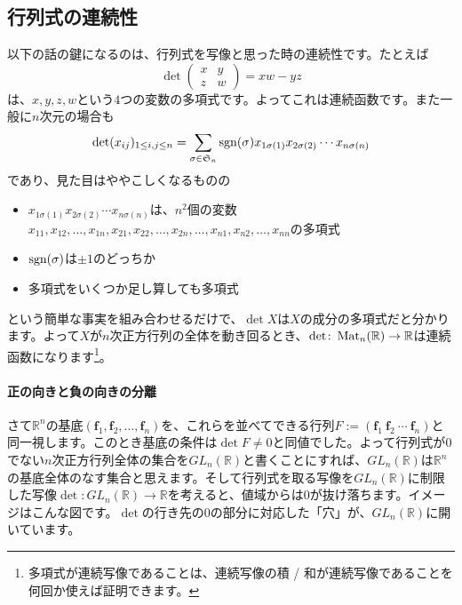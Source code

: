 
\subsection{行列式の連続性}

以下の話の鍵になるのは、行列式を写像と思った時の連続性です。たとえば
\[
\det
\begin{pmatrix}
x & y \\
z & w
\end{pmatrix}
= xw - yz
\]
は、$x, y, z, w$という$4$つの変数の多項式です。よってこれは連続函数です。また一般に$n$次元の場合も
\[
\det (x_{ij})_{1 \leq i, j \leq n} = \sum_{\sigma \in \mathfrak{S}_n} \operatorname{sgn}(\sigma) x_{1 \sigma(1)} x_{2 \sigma(2)} \cdots x_{n \sigma(n)}
\]
であり、見た目はややこしくなるものの
\begin{itemize}
\item $x_{1 \sigma(1)} x_{2 \sigma(2)} \cdots x_{n \sigma(n)}$は、$n^2$個の変数$x_{11}, x_{12}, \ldots, x_{1n}, x_{21}, x_{22}, \ldots, x_{2n}, \ldots, x_{n1}, x_{n2}, \ldots, x_{nn}$の多項式
\item $\operatorname{sgn}(\sigma)$は$\pm1$のどっちか
\item 多項式をいくつか足し算しても多項式
\end{itemize}
という簡単な事実を組み合わせるだけで、$\det X$は$X$の成分の多項式だと分かります。よって$X$が$n$次正方行列の全体を動き回るとき、$\det\colon \operatorname{Mat}_n(\mathbb{R}) \rightarrow \mathbb{R}$は連続函数になります\footnote{多項式が連続写像であることは、連続写像の積 / 和が連続写像であることを何回か使えば証明できます。}。

\paragraph{正の向きと負の向きの分離}
さて$\mathbb{R}^n$の基底$(\bm{f}_1, \bm{f}_2, \ldots, \bm{f}_n)$を、これらを並べてできる行列$F := (\bm{f}_1 \  \bm{f}_2 \  \cdots \  \bm{f}_n)$と同一視します。このとき基底の条件は$\det F \neq 0$と同値でした。よって行列式が$0$でない$n$次正方行列全体の集合を$GL_n(\mathbb{R})$と書くことにすれば、$GL_n(\mathbb{R})$は$\mathbb{R}^n$の基底全体のなす集合と思えます。そして行列式を取る写像を$GL_n(\mathbb{R})$に制限した写像$\det\colon GL_n(\mathbb{R}) \rightarrow \mathbb{R}$を考えると、値域からは$0$が抜け落ちます。イメージはこんな図です。$\det$の行き先の$0$の部分に対応した「穴」が、$GL_n(\mathbb{R})$に開いています。

